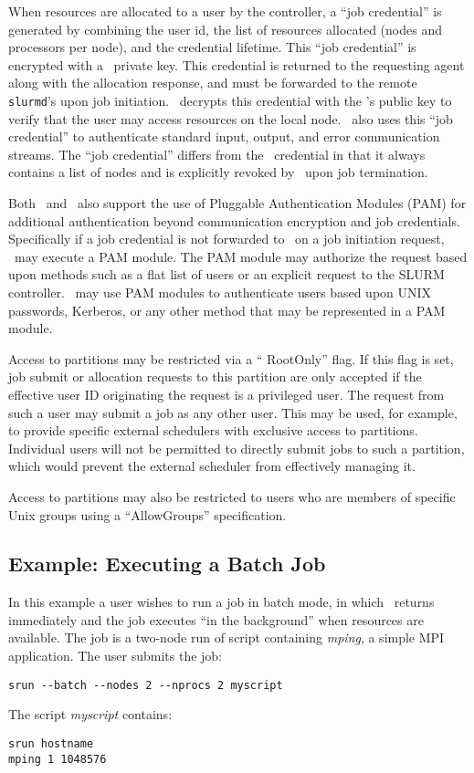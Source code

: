When resources are allocated to a user by the controller, a ``job 
credential'' is generated by combining the user id, the list of
resources allocated (nodes and processors per node), and the credential
lifetime. This ``job credential'' is encrypted with a \slurmctld\ private key. 
This credential is returned to the requesting agent along with the
allocation response, and must be forwarded to the remote {\tt slurmd}'s 
upon job initiation. \slurmd\ decrypts this credential with the
\slurmctld 's public key to verify that the user may access
resources on the local node. \slurmd\ also uses this ``job credential'' 
to authenticate standard input, output, and error communication streams. 
The ``job credential'' differs from the \munged\ credential in that 
it always contains a list of nodes and is explicitly revoked by 
\slurmctld\ upon job termination.

Both \slurmd\ and \slurmctld\ also support the use
of Pluggable Authentication Modules (PAM) for additional authentication 
beyond communication encryption and job credentials. Specifically if a
job credential is not forwarded to \slurmd\ on a job initiation request,
\slurmd\ may execute a PAM module.
The PAM module may authorize the request
based upon methods such as a flat list of users or an explicit request
to the SLURM controller. \slurmctld\ may use PAM modules to authenticate
users based upon UNIX passwords, Kerberos, or any other method that
may be represented in a PAM module.

Access to partitions may be restricted via a `` RootOnly'' flag.  
If this flag is set, job submit or allocation requests to this 
partition are only accepted if the effective user ID originating 
the request is a privileged user. 
The request from such a user may submit a job as any other user. 
This may be used, for example, to provide specific external schedulers
with exclusive access to partitions.  Individual users will not be 
permitted to directly submit jobs to such a partition, which would 
prevent the external scheduler from effectively managing it.  

Access to partitions may also be restricted to users who are 
members of specific Unix groups using a ``AllowGroups'' specification.

\subsection{Example:  Executing a Batch Job}

In this example a user wishes to run a job in batch mode, in which \srun\ returns 
immediately and the job executes ``in the background'' when resources
are available.
The job is a two-node run of script containing {\em mping}, a simple MPI application.
The user submits the job:
\begin{verbatim}
srun --batch --nodes 2 --nprocs 2 myscript
\end{verbatim}
The script {\em myscript} contains:
\begin{verbatim}
srun hostname
mping 1 1048576
\end{verbatim}

